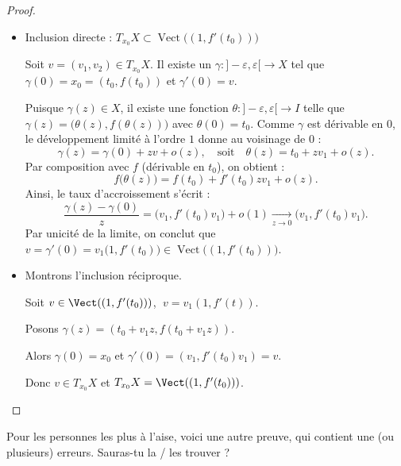 \begin{proof}
    \begin{itemize}
        \item Inclusion directe : $T_{x_0}X \subset \operatorname{Vect}\big((1, f'(t_0))\big)$

        Soit $v = (v_1, v_2) \in T_{x_0}X$. Il existe un $\gamma : ]-\varepsilon, \varepsilon[ \to X$ tel que $\gamma(0) = x_0 = (t_0, f(t_0))$ et $\gamma'(0) = v$.

        Puisque $\gamma(z) \in X$, il existe une fonction $\theta : ]-\varepsilon, \varepsilon[ \to I$ telle que $\gamma(z) = \big(\theta(z), f(\theta(z))\big)$ avec $\theta(0) = t_0$. Comme $\gamma$ est dérivable en $0$, le développement limité à l'ordre $1$ donne au voisinage de $0$ :
        \[
            \gamma(z) = \gamma(0) + zv + o(z), \quad \text{soit} \quad \theta(z) = t_0 + zv_1 + o(z).
        \]
        Par composition avec $f$ (dérivable en $t_0$), on obtient :
        \[
            f\big(\theta(z)\big) = f(t_0) + f'(t_0)zv_1 + o(z).
        \]
        Ainsi, le taux d'accroissement s'écrit :
        \[
            \frac{\gamma(z) - \gamma(0)}{z} = \big(v_1, f'(t_0)v_1\big) + o(1) \xrightarrow[z \to 0]{} \big(v_1, f'(t_0)v_1\big).
        \]
        Par unicité de la limite, on conclut que $v = \gamma'(0) = v_1\big(1, f'(t_0)\big) \in \operatorname{Vect}\big((1, f'(t_0))\big)$.

        \item Montrons l'inclusion réciproque. 
    
        Soit $v \in \Vect((1, f'(t_0)))$, $\; v = v_1 (1, f'(t))$.

        Posons $\gamma(z) = (t_0 + v_1 z, f(t_0 + v_1 z))$.

        Alors $\gamma(0) = x_0$ et $\gamma'(0) = (v_1, f'(t_0) v_1) = v$.

        Donc $v \in T_{x_0}X$ et $T_{x_0}X = \Vect((1, f'(t_0)))$.
    \end{itemize}
\end{proof}

Pour les personnes les plus à l'aise, voici une autre preuve, qui contient une (ou plusieurs) erreurs. 
Sauras-tu la / les trouver ?

